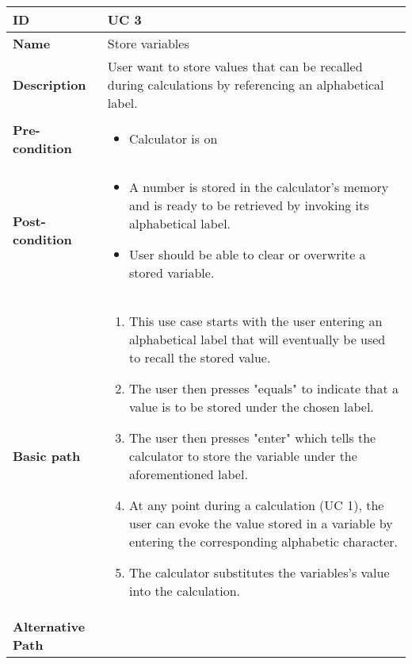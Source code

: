 \documentclass{article}
\begin{document}
\begin{table}[!h]
\begin{tabular}{|p{3cm}|p{9cm}|}
\hline
\textbf{ID} & UC 3  \\ \hline
\textbf{Name} & Store variables  \\ \hline
\textbf{Description} & User want to store values that can be recalled during calculations by referencing an alphabetical label.  \\ \hline
\textbf{Pre-condition} &
	\begin{itemize}
		\vspace{-2mm}
		\item Calculator is on
		\vspace{-3.5mm}
	\end{itemize}  \\ \hline
\textbf{Post-condition} &
	\begin{itemize}
		\vspace{-2mm}
		\item A number is stored in the calculator's memory and is ready to be retrieved by invoking its alphabetical label.
		\item User should be able to clear or overwrite a stored variable.
		\vspace{-3.5mm}
	\end{itemize}  \\ \hline
\textbf{Basic path} &
	\begin{enumerate}
		\vspace{-2mm}
		\item This use case starts with the user entering an alphabetical label that will eventually be used to recall the stored value.
		\item The user then presses "equals" to indicate that a value is to be stored under the chosen label.
		\item The user then presses "enter" which tells the calculator to store the variable under the aforementioned label.
		\item At any point during a calculation (UC 1), the user can evoke the value stored in a variable by entering the corresponding alphabetic character.
		\item The calculator substitutes the variables's value into the calculation.
		\vspace{-3.5mm}
	\end{enumerate}  \\ \hline
\textbf{Alternative Path} &
	\begin{itemize}[leftmargin=6mm]
		\vspace{-2mm}

\end{itemize}
\end{tabular}
\end{table}
\end{document}
